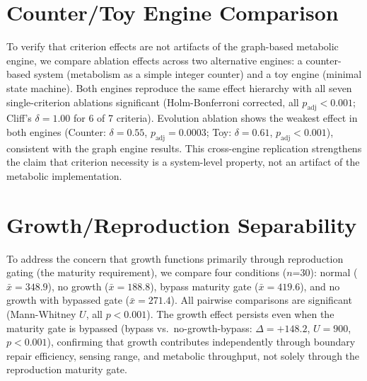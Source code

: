 \documentclass[letterpaper]{article}
\begin{document}
\section{Counter/Toy Engine Comparison}

To verify that criterion effects are not artifacts of the graph-based
metabolic engine, we compare ablation effects across two alternative
engines: a counter-based system (metabolism as a simple integer counter)
and a toy engine (minimal state machine).
Both engines reproduce the same effect hierarchy with all seven
single-criterion ablations significant (Holm-Bonferroni corrected,
all $p_{\text{adj}} < 0.001$; Cliff's $\delta = 1.00$ for 6 of 7 criteria).
Evolution ablation shows the weakest effect in both engines
(Counter: $\delta=0.55$, $p_{\text{adj}}=0.0003$;
Toy: $\delta=0.61$, $p_{\text{adj}} < 0.001$),
consistent with the graph engine results.
This cross-engine replication strengthens the claim that criterion necessity
is a system-level property, not an artifact of the metabolic implementation.

\section{Growth/Reproduction Separability}

To address the concern that growth functions primarily through reproduction
gating (the maturity requirement), we compare four conditions ($n$=30):
normal ($\bar{x}=348.9$), no growth ($\bar{x}=188.8$),
bypass maturity gate ($\bar{x}=419.6$), and no growth with bypassed gate
($\bar{x}=271.4$).
All pairwise comparisons are significant (Mann-Whitney $U$, all $p < 0.001$).
The growth effect persists even when the maturity gate is bypassed
(bypass vs.\ no-growth-bypass: $\Delta=+148.2$, $U=900$, $p < 0.001$),
confirming that growth contributes independently through boundary repair
efficiency, sensing range, and metabolic throughput, not solely through
the reproduction maturity gate.
\end{document}
